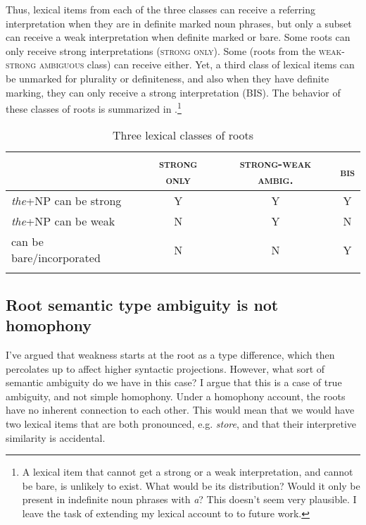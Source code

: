 \documentclass[output=paper,
modfonts
]{langscibook}
\begin{document}
Thus, lexical items from each of the three classes can receive a referring interpretation when they are in definite marked noun phrases, but only a subset can receive a weak interpretation when definite marked or bare. Some roots can only receive strong interpretations (\textsc{strong only}). Some (roots from the \textsc{weak-strong ambiguous} class) can receive either. Yet, a third class of lexical items can be unmarked for plurality or definiteness, and also when they have definite marking, they can only receive a strong interpretation (\textsc{BIS}). The behavior of these classes of roots is summarized in .\footnote{A lexical item that cannot get a strong or a weak interpretation, and cannot be bare, is unlikely to exist. What would be its distribution? Would it only be present in indefinite noun phrases with \textit{a}? This doesn't seem very plausible. I leave the task of extending my lexical account to  to future work.} 

\begin{table}[h]
\caption{Three lexical classes of roots}
\label{tab:williams:3}
\begin{tabularx}{\textwidth}{lccc} 
 \lsptoprule
 & \textsc{strong only} & \textsc{strong-weak ambig.}  & \textsc{bis}\\ 
 \midrule
 \textit{the}+NP can be strong  &  \textsc{Y} &     \textsc{Y}  &  \textsc{Y}  \\
 \textit{the}+NP can be weak  &   \textsc{N}  & \textsc{Y} & \textsc{N} \\
 can be bare/incorporated  &   \textsc{N}  & \textsc{N} & \textsc{Y} \\
 \lspbottomrule
\end{tabularx}
\end{table}

\subsection{Root semantic type ambiguity is not homophony}

I've argued that weakness starts at the root as a type difference, which then percolates up to affect higher syntactic projections. However, what sort of semantic ambiguity do we have in this case? I argue that this is a case of true ambiguity, and not simple homophony.  Under a homophony account, the roots have no inherent connection to each other. This would mean that we would have two lexical items that are both pronounced, e.g. \textit{store}, and that their interpretive similarity is accidental. 
\end{document}
